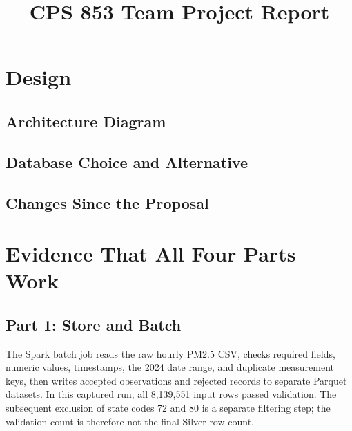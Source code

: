 \documentclass[11pt,letterpaper]{article}
\title{CPS 853 Team Project Report}
\author{} %
\date{}
\begin{document}
\maketitle

\section{Design}

\subsection{Architecture Diagram}

\subsection{Database Choice and Alternative}

\subsection{Changes Since the Proposal}

\section{Evidence That All Four Parts Work}

\subsection{Part 1: Store and Batch}
The Spark batch job reads the raw hourly PM2.5 CSV, checks required fields,
numeric values, timestamps, the 2024 date range, and duplicate measurement keys,
then writes accepted observations and rejected records to separate Parquet
datasets. In this captured run, all 8,139,551 input rows passed validation.
The subsequent exclusion of state codes 72 and 80 is a separate filtering step;
the validation count is therefore not the final Silver row count.
\end{document}
